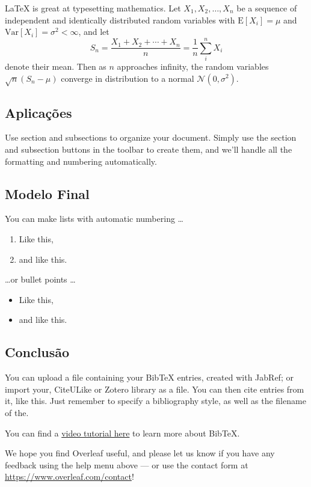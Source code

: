 \documentclass[a4paper]{article}
\begin{document}
\LaTeX{} is great at typesetting mathematics. Let $X_1, X_2, \ldots, X_n$ be a sequence of independent and identically distributed random variables with $\text{E}[X_i] = \mu$ and $\text{Var}[X_i] = \sigma^2 < \infty$, and let
\[S_n = \frac{X_1 + X_2 + \cdots + X_n}{n}
      = \frac{1}{n}\sum_{i}^{n} X_i\]
denote their mean. Then as $n$ approaches infinity, the random variables $\sqrt{n}(S_n - \mu)$ converge in distribution to a normal $\mathcal{N}(0, \sigma^2)$.


\subsection{Aplicações}

Use section and subsections to organize your document. Simply use the section and subsection buttons in the toolbar to create them, and we'll handle all the formatting and numbering automatically.

\subsection{Modelo Final}

You can make lists with automatic numbering \dots

\begin{enumerate}
\item Like this,
\item and like this.
\end{enumerate}
\dots or bullet points \dots
\begin{itemize}
\item Like this,
\item and like this.
\end{itemize}

\subsection{Conclusão}

You can upload a file containing your BibTeX entries, created with JabRef; or import your, CiteULike or Zotero library as a file. You can then cite entries from it, like this. Just remember to specify a bibliography style, as well as the filename of the.

You can find a \href{https://www.overleaf.com/help/97-how-to-include-a-bibliography-using-bibtex}{video tutorial here} to learn more about BibTeX.

We hope you find Overleaf useful, and please let us know if you have any feedback using the help menu above --- or use the contact form at \url{https://www.overleaf.com/contact}!




\selectfont
\end{document}
